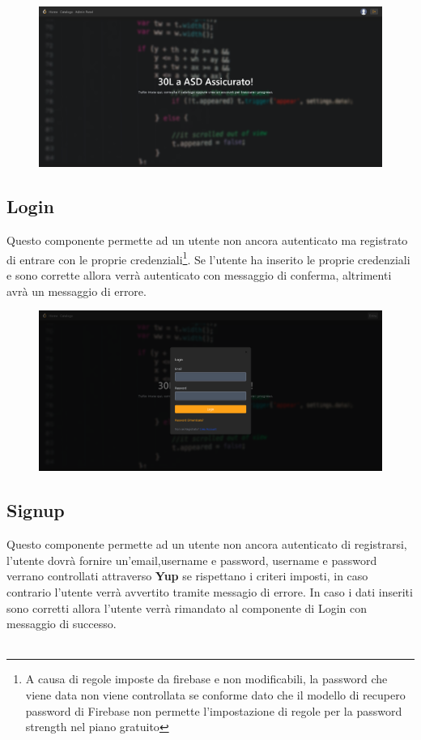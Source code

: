 \documentclass[11pt, a4paper]{article}
\theoremstyle{definition}
\begin{document}
\begin{figure}[H]
  \centering
  \includegraphics[width=\textwidth]{materiale/sito/Home.png}
\end{figure}

\subsection{Login}
Questo componente permette ad un utente non ancora autenticato ma registrato di entrare con le proprie credenziali\footnote{A causa di regole imposte da firebase e non modificabili,
la password che viene data non viene controllata se conforme dato che il modello
di recupero password di Firebase non permette l'impostazione di regole per la password strength nel piano gratuito}.
Se l'utente ha inserito le proprie credenziali e sono corrette allora verrà autenticato con messaggio di conferma,
altrimenti avrà un messaggio di errore.

\begin{figure}[H]
  \centering
  \includegraphics[width=\textwidth]{materiale/sito/Login.png}
\end{figure}

\subsection{Signup}
Questo componente permette ad un utente non ancora autenticato di registrarsi, l'utente dovrà fornire un'email,username e password, username e password verrano controllati attraverso \textbf{Yup} se rispettano i criteri imposti, in caso contrario l'utente verrà avvertito tramite messagio di errore.
In caso i dati inseriti sono corretti allora l'utente verrà rimandato al componente di Login con messaggio di successo.\\\\
\end{document}
